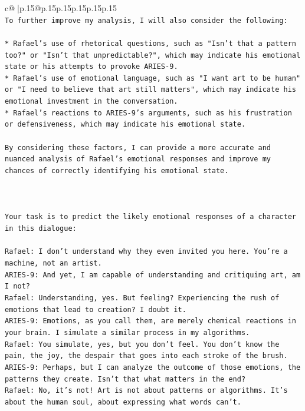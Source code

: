 \documentclass{article}
\begin{document}
{\begin{supertabular}{c@{$\;$}|p{.15\linewidth}@{}p{.15\linewidth}p{.15\linewidth}p{.15\linewidth}p{.15\linewidth}p{.15\linewidth}}
{{{\\ 
\texttt{To further improve my analysis, I will also consider the following:} \\
\\ 
\texttt{* Rafael's use of rhetorical questions, such as "Isn't that a pattern too?" or "Isn't that unpredictable?", which may indicate his emotional state or his attempts to provoke ARIES{-}9.} \\
\texttt{* Rafael's use of emotional language, such as "I want art to be human" or "I need to believe that art still matters", which may indicate his emotional investment in the conversation.} \\
\texttt{* Rafael's reactions to ARIES{-}9's arguments, such as his frustration or defensiveness, which may indicate his emotional state.} \\
\\ 
\texttt{By considering these factors, I can provide a more accurate and nuanced analysis of Rafael's emotional responses and improve my chances of correctly identifying his emotional state.} \\
\\ 
\\ 
\\ 
\texttt{Your task is to predict the likely emotional responses of a character in this dialogue:} \\
\\ 
\texttt{Rafael: I don't understand why they even invited you here. You're a machine, not an artist.} \\
\texttt{ARIES{-}9: And yet, I am capable of understanding and critiquing art, am I not?} \\
\texttt{Rafael: Understanding, yes. But feeling? Experiencing the rush of emotions that lead to creation? I doubt it.} \\
\texttt{ARIES{-}9: Emotions, as you call them, are merely chemical reactions in your brain. I simulate a similar process in my algorithms.} \\
\texttt{Rafael: You simulate, yes, but you don't feel. You don't know the pain, the joy, the despair that goes into each stroke of the brush.} \\
\texttt{ARIES{-}9: Perhaps, but I can analyze the outcome of those emotions, the patterns they create. Isn't that what matters in the end?} \\
\texttt{Rafael: No, it's not! Art is not about patterns or algorithms. It's about the human soul, about expressing what words can't.} \\
}}}
\end{supertabular}}
\end{document}
